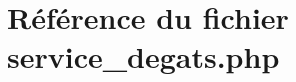 \hypertarget{service__degats_8php}{
\section{R\'{e}f\'{e}rence du fichier service\_\-degats.php}
\label{service__degats_8php}
}
